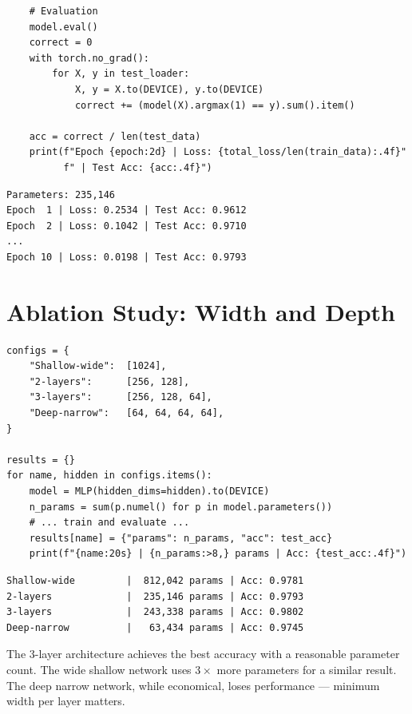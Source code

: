 \begin{codeblock}[title=\textbf{MLP in PyTorch --- MNIST Classification}]
\begin{verbatim}
    # Evaluation
    model.eval()
    correct = 0
    with torch.no_grad():
        for X, y in test_loader:
            X, y = X.to(DEVICE), y.to(DEVICE)
            correct += (model(X).argmax(1) == y).sum().item()

    acc = correct / len(test_data)
    print(f"Epoch {epoch:2d} | Loss: {total_loss/len(train_data):.4f}"
          f" | Test Acc: {acc:.4f}")
\end{verbatim}
\end{codeblock}

\begin{codeoutput}
\begin{verbatim}
Parameters: 235,146
Epoch  1 | Loss: 0.2534 | Test Acc: 0.9612
Epoch  2 | Loss: 0.1042 | Test Acc: 0.9710
...
Epoch 10 | Loss: 0.0198 | Test Acc: 0.9793
\end{verbatim}
\end{codeoutput}

\section{Ablation Study: Width and Depth}
\label{sec:ablation_mlp}

\begin{codeblock}[title=\textbf{Ablation Study}]
\begin{verbatim}
configs = {
    "Shallow-wide":  [1024],
    "2-layers":      [256, 128],
    "3-layers":      [256, 128, 64],
    "Deep-narrow":   [64, 64, 64, 64],
}

results = {}
for name, hidden in configs.items():
    model = MLP(hidden_dims=hidden).to(DEVICE)
    n_params = sum(p.numel() for p in model.parameters())
    # ... train and evaluate ...
    results[name] = {"params": n_params, "acc": test_acc}
    print(f"{name:20s} | {n_params:>8,} params | Acc: {test_acc:.4f}")
\end{verbatim}
\end{codeblock}

\begin{codeoutput}
\begin{verbatim}
Shallow-wide         |  812,042 params | Acc: 0.9781
2-layers             |  235,146 params | Acc: 0.9793
3-layers             |  243,338 params | Acc: 0.9802
Deep-narrow          |   63,434 params | Acc: 0.9745
\end{verbatim}
\end{codeoutput}

\begin{remark}
The 3-layer architecture achieves the best accuracy with a reasonable parameter count. The wide shallow network uses $3\times$ more parameters for a similar result. The deep narrow network, while economical, loses performance --- minimum width per layer matters.
\end{remark}

